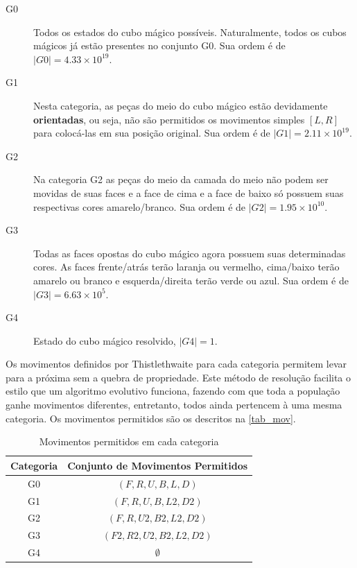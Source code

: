 \documentclass[12pt]{article}
\begin{document}
    \begin{description}
      \item [G0] Todos os estados do cubo mágico possíveis. Naturalmente, todos os cubos mágicos já estão presentes no conjunto G0. Sua ordem é de $|G0| = 4.33 \times 10^{19}$.
      \item [G1] Nesta categoria, as peças do meio do cubo mágico estão devidamente \textbf{orientadas}, ou seja, não são permitidos os movimentos simples $[L, R]$ para colocá-las em sua posição original. Sua ordem é de $|G1| = 2.11 \times 10^{19}$.
      \item [G2] Na categoria G2 as peças do meio da camada do meio não podem ser movidas de suas faces e a face de cima e a face de baixo só possuem suas respectivas cores amarelo/branco. Sua ordem é de $|G2| = 1.95 \times 10^{10}$.
      \item [G3] Todas as faces opostas do cubo mágico agora possuem suas determinadas cores. As faces frente/atrás terão laranja ou vermelho, cima/baixo terão amarelo ou branco e esquerda/direita terão verde ou azul. Sua ordem é de $|G3| = 6.63 \times 10^{5}$.
      \item [G4] Estado do cubo mágico resolvido, $|G4| = 1$.
    \end{description}

  Os movimentos definidos por Thistlethwaite para cada categoria permitem levar para a próxima sem a quebra de propriedade. Este método de resolução facilita o estilo que um algoritmo evolutivo funciona, fazendo com que toda a população ganhe movimentos diferentes, entretanto, todos ainda pertencem à uma mesma categoria. Os movimentos permitidos são os descritos na \autoref{tab_mov}.

  \begin{table}[ht]
      \centering
      \caption{Movimentos permitidos em cada categoria} \label{tab_mov}
      \begin{tabular}{|c|c|}
        \hline
        \textbf{Categoria} & \textbf{Conjunto de Movimentos Permitidos}  \\ \hline
            G0             &  $(F, R, U, B, L, D)$           \\ \hline
            G1             &  $(F, R, U, B, L2, D2)$         \\ \hline
            G2             &  $(F, R, U2, B2, L2, D2)$       \\ \hline
            G3             &  $(F2, R2, U2, B2, L2, D2)$     \\ \hline
            G4             &  $\emptyset$                    \\ \hline
      \end{tabular}
  \end{table}
\end{document}
